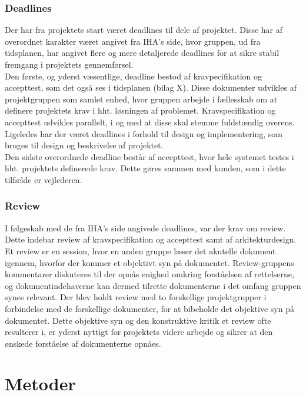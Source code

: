 \subsubsection{Deadlines}
Der har fra projektets start været deadlines til dele af projektet. Disse har af overordnet karakter været angivet fra IHA's side, hvor gruppen, ud fra tidsplanen, har angivet flere og mere detaljerede deadlines for at sikre stabil fremgang i projektets gennemførsel. \\
Den første, og yderst væsentlige, deadline bestod af kravpecifikation og accepttest, som det også ses i tidsplanen (bilag X). Disse dokumenter udvikles af projektgruppen som samlet enhed, hvor gruppen arbejde i fællesskab om at definere projektets krav i hht. løsningen af problemet. Kravspecifikation og accepttest udvikles parallelt, i og med at disse skal stemme fuldstændig overens. \\
\newline
Ligeledes har der været deadlines i forhold til design og implementering, som bruges til design og beskrivelse af projektet.\\
\newline
Den sidste overordnede deadline består af accepttest, hvor hele systemet testes i hht. projektets definerede krav. Dette gøres sammen med kunden, som i dette tilfælde er vejlederen. 


\subsubsection{Review}
I følgeskab med de fra IHA's side angivede deadlines, var der krav om review. Dette indebar review af kravspecifikation og accepttest samt af arkitekturdesign. Et review er en session, hvor en anden gruppe læser det akutelle dokument igennem, hvorfor der kommer et objektivt syn på dokumentet. Review-gruppens kommentarer diskuteres til der opnås enighed omkring forståelsen af rettelserne, og dokumentindehaverne kan dermed tilrette dokumenterne i det omfang gruppen synes relevant. Der blev holdt review med to forskellige projektgrupper i forbindelse med de forskellige dokumenter, for at bibeholde det objektive syn på dokumentet. Dette objektive syn og den konstruktive kritik et review ofte resulterer i, er yderst nyttigt for projektets videre arbejde og sikrer at den ønskede forståelse af dokumenterne opnåes.

\section{Metoder}
